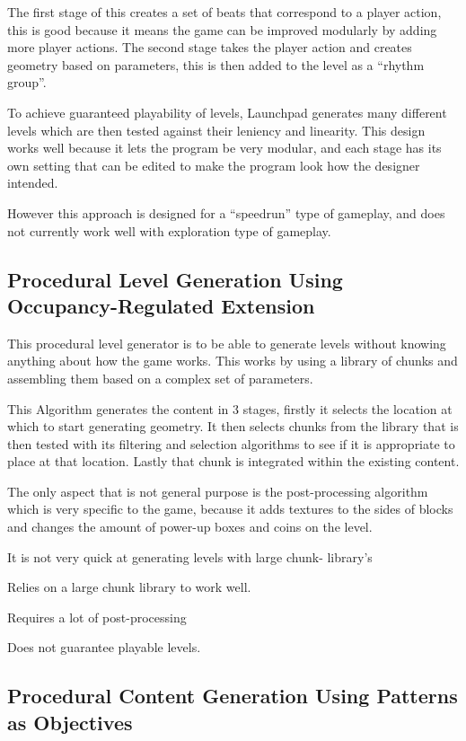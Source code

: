 \documentclass{scrartcl}
\begin{document}
The first stage of this creates a set of beats that correspond to a player action, this is good because it means the game can be improved modularly by adding more player actions.
The second stage takes the player action and creates geometry based on parameters, this is then added to the level as a ``rhythm group''. 

To achieve guaranteed playability of levels, Launchpad generates many different levels which are then tested against their leniency and linearity. This design works well because it lets the program be very modular, and each stage has its own setting that can be edited to make the program look how the designer intended.

However this approach is designed for a ``speedrun''  type of gameplay, and does not currently work well with exploration type of gameplay.


\subsection{Procedural Level Generation Using Occupancy-Regulated Extension}

This procedural level generator is to be able to generate levels without knowing anything about how the game works. This works by using a library of chunks and assembling them based on a complex set of parameters. 

This Algorithm generates the content in 3 stages, firstly it selects the location at which to start generating geometry. It then selects chunks from the library that is then tested with its filtering and selection algorithms to see if it is appropriate to place at that location. Lastly that chunk is integrated within the existing content.

The only aspect that is not general purpose is the post-processing algorithm which is very specific to the game, because it adds textures to the sides of blocks and changes the amount of power-up boxes and coins on the level.

It is not very quick at generating levels with large chunk- library's

Relies on a large chunk library to work well. 

Requires a lot of post-processing

Does not guarantee playable levels.



\subsection{Procedural Content Generation Using Patterns as Objectives}
\end{document}
